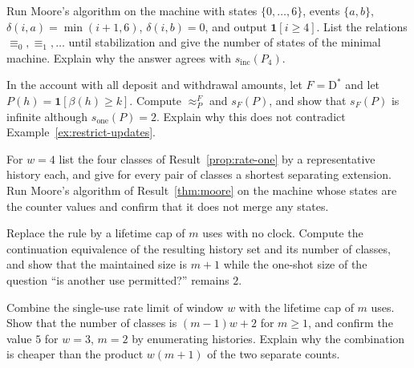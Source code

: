 \begin{exercise}
Run Moore's algorithm on the machine with states $\{0,\dots,6\}$, events $\{a,b\}$, $\delta(i,a)=\min(i+1,6)$, $\delta(i,b)=0$, and output $\mathbf 1[i\ge4]$. List the relations $\equiv_0,\equiv_1,\dots$ until stabilization and give the number of states of the minimal machine. Explain why the answer agrees with $s_{\mathrm{inc}}(P_4)$.
\end{exercise}

\begin{exercise}
In the account with all deposit and withdrawal amounts, let $F=\mathrm D^{*}$ and let $P(h)=\mathbf 1[\beta(h)\ge k]$. Compute $\approx^{F}_P$ and $s_F(P)$, and show that $s_F(P)$ is infinite although $s_{\mathrm{one}}(P)=2$. Explain why this does not contradict Example~\ref{ex:restrict-updates}.
\end{exercise}


\begin{exercise}
For $w=4$ list the four classes of Result~\ref{prop:rate-one} by a representative history each, and give for every pair of classes a shortest separating extension. Run Moore's algorithm of Result~\ref{thm:moore} on the machine whose states are the counter values and confirm that it does not merge any states.
\end{exercise}

\begin{exercise}
Replace the rule by a lifetime cap of $m$ uses with no clock. Compute the continuation equivalence of the resulting history set and its number of classes, and show that the maintained size is $m+1$ while the one-shot size of the question ``is another use permitted?'' remains $2$.\label{ex:lifetime}
\end{exercise}

\begin{exercise}
Combine the single-use rate limit of window $w$ with the lifetime cap of $m$ uses. Show that the number of classes is $(m-1)w+2$ for $m\ge1$, and confirm the value $5$ for $w=3$, $m=2$ by enumerating histories. Explain why the combination is cheaper than the product $w(m+1)$ of the two separate counts.\label{ex:rate-cap}
\end{exercise}

